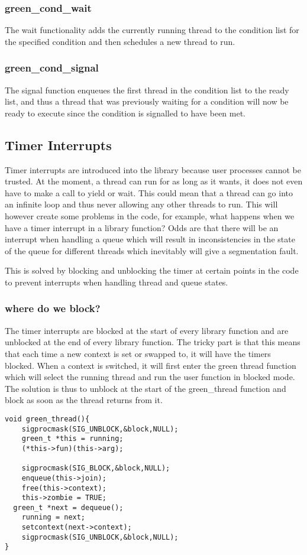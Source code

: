 \documentclass[12pt]{article}
\begin{document}
\subsubsection{green\_cond\_wait}
The wait functionality adds the currently running thread to the condition list for the specified condition and then schedules a new thread to run.
\subsubsection{green\_cond\_signal}
The signal function enqueues the first thread in the condition list to the ready list, and thus a thread that was previously waiting for a condition will now be ready to execute since the condition is signalled to have been met.

\subsection{Timer Interrupts}
Timer interrupts are introduced into the library because user processes cannot be trusted. At the moment, a thread can run for as long as it wants, it does not even have to make a call to yield or wait. This could mean that a thread can go into an infinite loop and thus never allowing any other threads to run. This will however create some problems in the code, for example, what happens when we have a timer interrupt in a library function? Odds are that there will be an interrupt when handling a queue which will result in inconsistencies in the state of the queue for different threads which inevitably will give a segmentation fault.

This is solved by blocking and unblocking the timer at certain points in the code to prevent interrupts when handling thread and queue states.
\subsubsection{where do we block?}
The timer interrupts are blocked at the start of every library function and are unblocked at the end of every library function. The tricky part is that this means that each time a new context is set or swapped to, it will have the timers blocked. When a context is switched, it will first enter the green thread function which will select the running thread and run the user function in blocked mode. The solution is thus to unblock at the start of the green\_thread function and block as soon as the thread returns from it.

\begin{lstlisting}
void green_thread(){
	sigprocmask(SIG_UNBLOCK,&block,NULL);
	green_t *this = running;
	(*this->fun)(this->arg);

	sigprocmask(SIG_BLOCK,&block,NULL);
	enqueue(this->join);
	free(this->context);
	this->zombie = TRUE;
  green_t *next = dequeue();
	running = next;
	setcontext(next->context);
	sigprocmask(SIG_UNBLOCK,&block,NULL);
}
\end{lstlisting}
\end{document}
